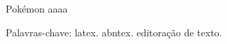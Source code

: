 \setlength{\absparsep}{18pt} 
\begin{resumo}[Resumo]
 
 Pokémon aaaa
 

 Palavras-chave: latex. abntex. editoração de texto.
\end{resumo}

%
